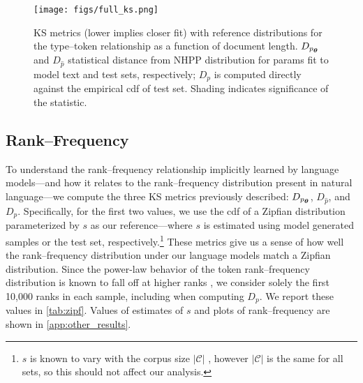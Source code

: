 \documentclass[11pt,a4paper]{article}
\newcommand{\calC}{\mathcal{C}}
\newcommand{\vtheta}{{\boldsymbol \theta}}
\newcommand{\ptheta}{p_{\scaleto{\vtheta}{4pt}}}
\begin{document}
\begin{figure*}
\centering
    \texttt{[image: figs/full\_ks.png]}
  
    \caption{ KS metrics (lower implies closer fit) with reference distributions for the type--token relationship as a function of document length. $D_{\ptheta}$ and $D_{\hat p}$ statistical distance from NHPP distribution for params fit to model text and test sets, respectively; $D_{p}$ is computed directly against the empirical cdf of test set. Shading indicates significance of the statistic.}\label{fig:ks}
    \vspace{-1em}
\end{figure*}
\subsection{Rank--Frequency}\label{exp:zipf}
To understand the rank--frequency relationship implicitly learned by language models---and how it relates to the rank--frequency distribution present in natural language---we compute the three KS metrics previously described: $D_{\ptheta}$, $D_{\hat p}$, and $D_{p}$. Specifically, for the first two values,  we use the cdf of a Zipfian distribution parameterized by $s$ as our reference---where $s$ is estimated using model generated samples or the test set, respectively.\footnote{$s$ is known to vary with the corpus size $|\calC|$ \cite{powers-1998-applications}, however $|\calC|$ is the same for all sets, so this should not affect our analysis.} These metrics give us a sense of how well the rank--frequency distribution under our language models match a Zipfian distribution. Since the power-law behavior of the token rank--frequency distribution is known to fall off at higher ranks \cite{Piantadosi2014ZipfsWF, validation}, we consider solely the first 10,000 ranks in each sample, including when computing $D_{p}$. 
We report these values in  \cref{tab:zipf}. Values of estimates of $s$ and plots of rank--frequency are shown in \cref{app:other_results}.

\end{document}
